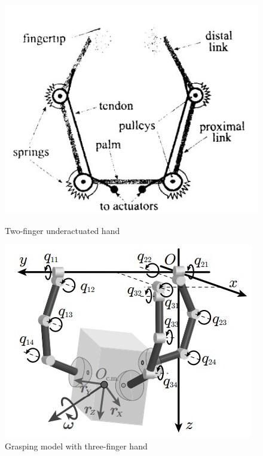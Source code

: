 \documentclass[a4paper,twoside,12pt,papersize, dvipdfmx]{iirthesis}
\begin{document}
\begin{figure}[b]
\begin{minipage}{0.49\hsize}
\centering
\includegraphics[width=0.9\hsize]{fig/1-introduction/Ospina/handmodel.jpg}
\caption{Two-finger underactuated hand \cite{ospina2020}}
\label{fig::ohand}
\end{minipage} \hfill
\begin{minipage}{0.49\hsize}
\centering
\includegraphics[width=0.9\hsize]{fig/1-introduction/tahara/modeling.jpg}
\caption{Grasping model with three-finger hand \cite{tahara2020}}
\label{fig::model}
\end{minipage}
\end{figure}
\end{document}
